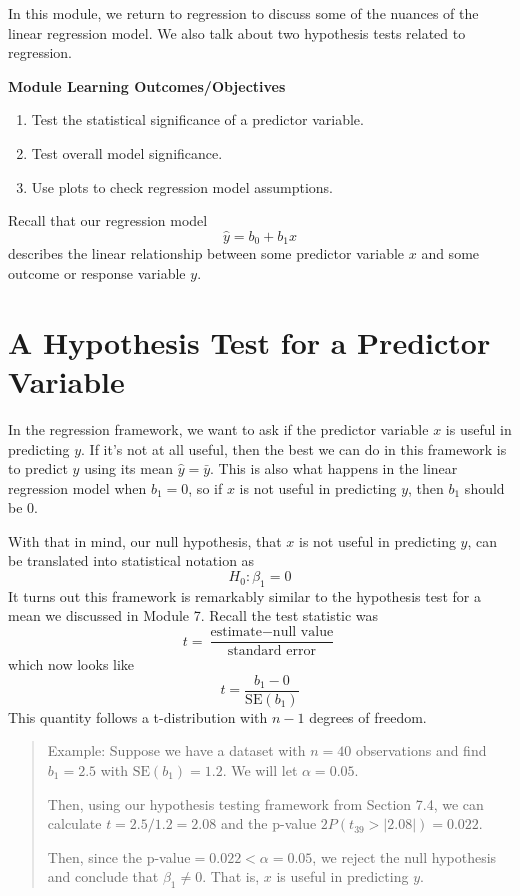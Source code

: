 \documentclass[
]{book}
\providecommand{\tightlist}{%
  \setlength{\itemsep}{0pt}\setlength{\parskip}{0pt}}
\begin{document}
In this module, we return to regression to discuss some of the nuances of the linear regression model. We also talk about two hypothesis tests related to regression.

\textbf{Module Learning Outcomes/Objectives}

\begin{enumerate}
\def\labelenumi{\arabic{enumi}.}
\tightlist
\item
  Test the statistical significance of a predictor variable.
\item
  Test overall model significance.
\item
  Use plots to check regression model assumptions.
\end{enumerate}

Recall that our regression model \[\hat{y} = b_0 + b_1x\] describes the linear relationship between some predictor variable \(x\) and some outcome or response variable \(y\).

\section{A Hypothesis Test for a Predictor Variable}\label{a-hypothesis-test-for-a-predictor-variable}

In the regression framework, we want to ask if the predictor variable \(x\) is useful in predicting \(y\). If it's not at all useful, then the best we can do in this framework is to predict \(y\) using its mean \(\hat{y} = \bar{y}\). This is also what happens in the linear regression model when \(b_1 = 0\), so if \(x\) is not useful in predicting \(y\), then \(b_1\) should be \(0\).

With that in mind, our null hypothesis, that \(x\) is not useful in predicting \(y\), can be translated into statistical notation as \[H_0: \beta_1 = 0\]
It turns out this framework is remarkably similar to the hypothesis test for a mean we discussed in Module 7. Recall the test statistic was \[t = \frac{\text{estimate}-\text{null value}}{\text{standard error}}\] which now looks like \[t = \frac{b_1 - 0}{\text{SE}(b_1)}\] This quantity follows a t-distribution with \(n-1\) degrees of freedom.

\begin{quote}
Example: Suppose we have a dataset with \(n=40\) observations and find \(b_1 = 2.5\) with \(\text{SE}(b_1)=1.2\). We will let \(\alpha=0.05\).

Then, using our hypothesis testing framework from Section 7.4, we can calculate \(t = 2.5/1.2 = 2.08\) and the p-value \(2P(t_{39} > |2.08|) = 0.022\).

Then, since the p-value\(=0.022<\alpha=0.05\), we reject the null hypothesis and conclude that \(\beta_1 \ne 0\). That is, \(x\) is useful in predicting \(y\).
\end{quote}
\end{document}
